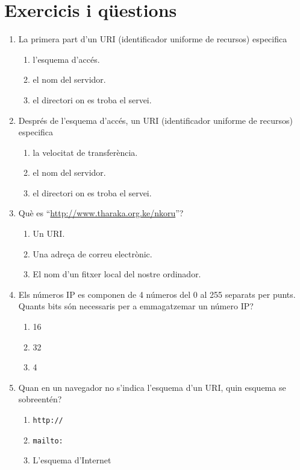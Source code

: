 \section{Exercicis i qüestions}
\begin{enumerate}

\item La primera part d'un URI (identificador uniforme de recursos)
especifica
     \begin{enumerate}
     \item l'esquema d'accés.
     \item el nom del servidor.
     \item el directori on es troba el servei.
     \end{enumerate}


\item Després de l'esquema d'accés, un URI (identificador uniforme de
  recursos) especifica
     \begin{enumerate}
     \item la velocitat de transferència.
     \item el nom del servidor.
     \item el directori on es troba el servei.
     \end{enumerate}

\item Què es ``\url{http://www.tharaka.org.ke/nkoru}''?
      \begin{enumerate}     
      \item Un URI.
      \item Una adreça de correu electrònic.
      \item El nom d'un fitxer local del nostre ordinador.
      \end{enumerate}

    \item Els números IP es componen de 4 números del 0 al 255
      separats per punts. Quants bits són necessaris per a
      emmagatzemar un número IP?
\begin{enumerate}
\item 16
\item 32
\item 4
\end{enumerate} 


\item 
   Quan en un navegador no s'indica l'esquema d'un URI, quin
   esquema se sobreentén?
   
\begin{enumerate}
\item \verb|http://|
\item \verb|mailto:|
\item L'esquema d'Internet
\end{enumerate}


\end{enumerate}
